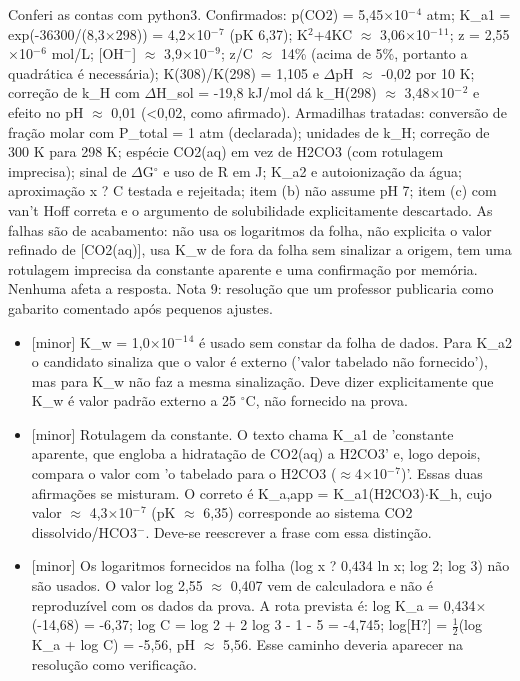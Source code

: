 \documentclass{article}%
\begin{document}
Conferi as contas com python3. Confirmados: p(CO2) = 5,45$\times$10$^{-}$$^{4}$ atm; K\_a1 = exp(-36300/(8,3$\times$298)) = 4,2$\times$10$^{-}$$^{7}$ (pK 6,37); K$^2$+4KC $\approx$ 3,06$\times$10$^{-}$$^{1}$$^{1}$; z = 2,55$\times$10$^{-}$$^{6}$ mol/L; {[}OH$^{-}${]} $\approx$ 3,9$\times$10$^{-}$$^{9}$; z/C $\approx$ 14\% (acima de 5\%, portanto a quadrática é necessária); K(308)/K(298) = 1,105 e $\Delta$pH $\approx$ -0,02 por 10 K; correção de k\_H com $\Delta$H\_sol = -19,8 kJ/mol dá k\_H(298) $\approx$ 3,48$\times$10$^{-}$$^2$ e efeito no pH $\approx$ 0,01 (<0,02, como afirmado).\newline%
\newline%
Armadilhas tratadas: conversão de fração molar com P\_total = 1 atm (declarada); unidades de k\_H; correção de 300 K para 298 K; espécie CO2(aq) em vez de H2CO3 (com rotulagem imprecisa); sinal de $\Delta$G$^\circ$ e uso de R em J; K\_a2 e autoionização da água; aproximação x ? C testada e rejeitada; item (b) não assume pH 7; item (c) com van't Hoff correta e o argumento de solubilidade explicitamente descartado.\newline%
\newline%
As falhas são de acabamento: não usa os logaritmos da folha, não explicita o valor refinado de {[}CO2(aq){]}, usa K\_w de fora da folha sem sinalizar a origem, tem uma rotulagem imprecisa da constante aparente e uma confirmação por memória. Nenhuma afeta a resposta. Nota 9: resolução que um professor publicaria como gabarito comentado após pequenos ajustes.%
\begin{itemize}%
\item%
{[}minor{]} K\_w = 1,0$\times$10$^{-}$$^{1}$$^{4}$ é usado sem constar da folha de dados. Para K\_a2 o candidato sinaliza que o valor é externo ('valor tabelado não fornecido'), mas para K\_w não faz a mesma sinalização. Deve dizer explicitamente que K\_w é valor padrão externo a 25 $^\circ$C, não fornecido na prova.%
\item%
{[}minor{]} Rotulagem da constante. O texto chama K\_a1 de 'constante aparente, que engloba a hidratação de CO2(aq) a H2CO3' e, logo depois, compara o valor com 'o tabelado para o H2CO3 ($\approx$4$\times$10$^{-}$$^{7}$)'. Essas duas afirmações se misturam. O correto é K\_a,app = K\_a1(H2CO3)$\cdot$K\_h, cujo valor $\approx$ 4,3$\times$10$^{-}$$^{7}$ (pK $\approx$ 6,35) corresponde ao sistema CO2 dissolvido/HCO3$^{-}$. Deve{-}se reescrever a frase com essa distinção.%
\item%
{[}minor{]} Os logaritmos fornecidos na folha (log x ? 0,434 ln x; log 2; log 3) não são usados. O valor log 2,55 $\approx$ 0,407 vem de calculadora e não é reproduzível com os dados da prova. A rota prevista é: log K\_a = 0,434$\times$(-14,68) = -6,37; log C = log 2 + 2 log 3 - 1 - 5 = -4,745; log{[}H?{]} = $\frac12$(log K\_a + log C) = -5,56, pH $\approx$ 5,56. Esse caminho deveria aparecer na resolução como verificação.%

\end{itemize}$$
\end{document}
